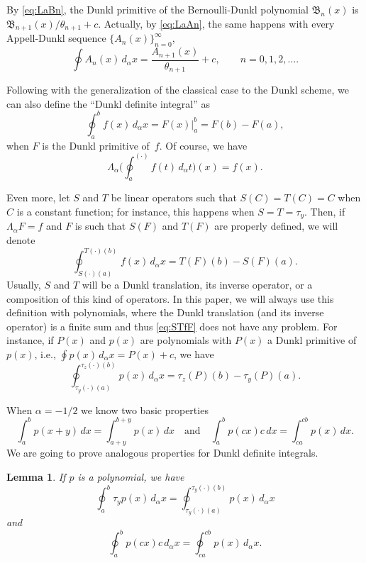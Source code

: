 \documentclass[10pt]{article}
\theoremstyle{plain}
\newtheorem{lemma}[theorem]{Lemma}
\theoremstyle{definition}
\numberwithin{equation}{section} %
\newcommand{\La}{\Lambda_{\alpha}}
\newcommand{\B}{\mathfrak{B}}
\begin{document}
By \eqref{eq:LaBn}, the Dunkl primitive of the Bernoulli-Dunkl polynomial
$\B_n(x)$ is $\B_{n+1}(x)/\theta_{n+1} + c$.
Actually, by \eqref{eq:LaAn}, the same happens with every Appell-Dunkl sequence $\{A_n(x)\}_{n=0}^\infty$,
\[
  \oint A_n(x)\,d_\alpha x = \frac{A_{n+1}(x)}{\theta_{n+1}} + c, 
  \qquad n = 0,1,2,\dots.
\]

Following with the generalization of the classical case to the Dunkl scheme, we can also define the ``Dunkl definite integral'' as
\[
  \oint_a^b f(x)\,d_\alpha x = F(x)\Big|_{a}^{b} = F(b)-F(a),
\]
when $F$ is the Dunkl primitive of~$f$. 
Of course, we have
\[
  \La \bigg(\oint_a^{(\cdot)} f(t)\,d_\alpha t\bigg)(x) = f(x).
\]

Even more, let $S$ and $T$ be linear operators such that $S(C) = T(C) = C$ when $C$ is a constant function; for instance, this happens when $S=T=\tau_y$.
Then, if $\La F = f$ and $F$ is such that $S(F)$ and $T(F)$ are properly defined, we will denote
\begin{equation}
\label{eq:STfF}
  \oint_{S(\cdot)(a)}^{T(\cdot)(b)} f(x)\,d_\alpha x = T(F)(b) - S(F)(a).
\end{equation}
Usually, $S$ and $T$ will be a Dunkl translation, its inverse operator, or a composition of this kind of operators.
In this paper, we will always use this definition with polynomials, where the Dunkl translation (and its inverse operator) is a finite sum and thus \eqref{eq:STfF} does not have any problem. For instance, if $P(x)$ and $p(x)$ are polynomials with $P(x)$ a Dunkl primitive of $p(x)$, i.e., $\oint p(x)\,d_\alpha x = P(x)+c$, we have
\begin{equation}
\label{eq:yzpP}
  \oint_{\tau_y(\cdot)(a)}^{\tau_z(\cdot)(b)} p(x)\,d_\alpha x = \tau_z(P)(b) - \tau_y(P)(a).
\end{equation}

When $\alpha=-1/2$ we know two basic properties 
\[
\int_{a}^{b} p(x+y)\,dx = \int_{a+y}^{b+y} p(x)\,dx
\quad\text{and}\quad
\int_{a}^{b} p(cx)c\,dx = \int_{ca}^{cb} p(x)\,dx.
\]
We are going to prove analogous properties for Dunkl definite integrals. 

\begin{lemma} 
If $p$ is a polynomial, we have
\begin{equation}
\label{eq:inttau}
  \oint_{a}^{b} \tau_y p(x)\,d_\alpha x 
  = \oint_{\tau_y(\cdot)(a)}^{\tau_y(\cdot)(b)} p(x)\,d_\alpha x
\end{equation}
and
\begin{equation}
\label{eq:intc}
  \oint_{a}^{b} p(cx)c\,d_\alpha x 
  = \oint_{ca}^{cb} p(x)\,d_\alpha x.
\end{equation}
\end{lemma}
\end{document}
